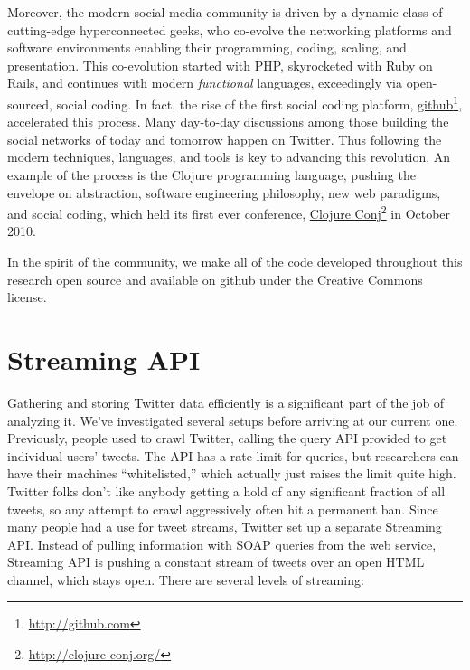 \documentclass[10pt,oneside]{memoir}
\begin{document}
\begin{Spacing}{2}
Moreover, the modern social media community is driven by a dynamic class of cutting-edge hyperconnected geeks, who co-evolve the networking platforms and software environments enabling their programming, coding, scaling, and presentation.  This co-evolution started with PHP, skyrocketed with Ruby on Rails, and continues with modern {\itshape functional} languages, exceedingly via open-sourced, social coding.  In fact, the rise of the first social coding platform, \href{http://github.com}{github}\footnote{\href{http://github.com}{http://github.com}}, accelerated this process. Many day-to-day discussions among those building the social networks of today and tomorrow happen on Twitter.  Thus following the modern techniques, languages, and tools is key to advancing this revolution.  An example of the process is the Clojure programming language, pushing the envelope on abstraction, software engineering philosophy, new web paradigms, and social coding, which held its first ever conference, \href{http://clojure-conj.org/}{Clojure Conj}\footnote{\href{http://clojure-conj.org/}{http://clojure-conj.org/}} in October 2010.


In the spirit of the community, we make all of the code developed throughout this research open source and available on github under the Creative Commons license.


\pagebreak \section{Streaming API}
\label{streamingapi}

\label{StreamingAPI}


Gathering and storing Twitter data efficiently is a significant part of the job of analyzing it.  We've investigated several setups before arriving at our current one.  Previously, people used to crawl Twitter, calling the query API provided to get individual users' tweets.  The API has a rate limit for queries, but researchers can have their machines ``whitelisted,'' which actually just raises the limit quite high.  Twitter folks don't like anybody getting a hold of any significant fraction of all tweets, so any attempt to crawl aggressively often hit a permanent ban.  Since many people had a use for tweet streams, Twitter set up a separate Streaming API.  Instead of pulling information with SOAP queries from the web service, Streaming API is pushing a constant stream of tweets over an open HTML channel, which stays open.  There are several levels of streaming:



\end{Spacing}
\end{document}
